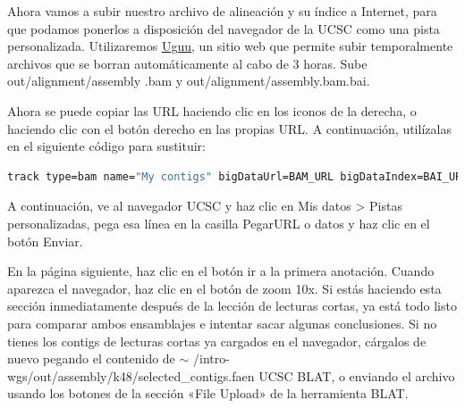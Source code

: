 Ahora vamos a subir nuestro archivo de alineación y su índice a Internet, para que podamos ponerlos a disposición del navegador de la UCSC como una pista personalizada.
Utilizaremos \href{https://uguu.se/}{Uguu}, un sitio web que permite subir temporalmente archivos que se borran automáticamente al cabo de 3 horas.
Sube out/alignment/assembly .bam y out/alignment/assembly.bam.bai. 

Ahora se puede copiar las URL haciendo clic en los iconos de la derecha, o haciendo clic con el botón derecho en las propias URL. A continuación, utilízalas en el siguiente código para sustituir:
\begin{lstlisting}[language=bash]
track type=bam name="My contigs" bigDataUrl=BAM_URL bigDataIndex=BAI_URL
\end{lstlisting}

A continuación, ve al navegador UCSC y haz clic en Mis datos > Pistas personalizadas, pega esa línea en la casilla PegarURL o datos y haz clic en el botón Enviar.

En la página siguiente, haz clic en el botón ir a la primera anotación. Cuando aparezca el navegador, haz clic en el botón de zoom 10x.
Si estás haciendo esta sección inmediatamente después de la lección de lecturas cortas, ya está todo listo para comparar ambos ensamblajes e intentar sacar algunas conclusiones.
Si no tienes los contigs de lecturas cortas ya cargados en el navegador, cárgalos de nuevo pegando el contenido de $\sim$ /intro-wgs/out/assembly/k48/selected\_contigs.faen UCSC BLAT, o enviando el archivo usando los botones de la sección «File Upload» de la herramienta BLAT.
